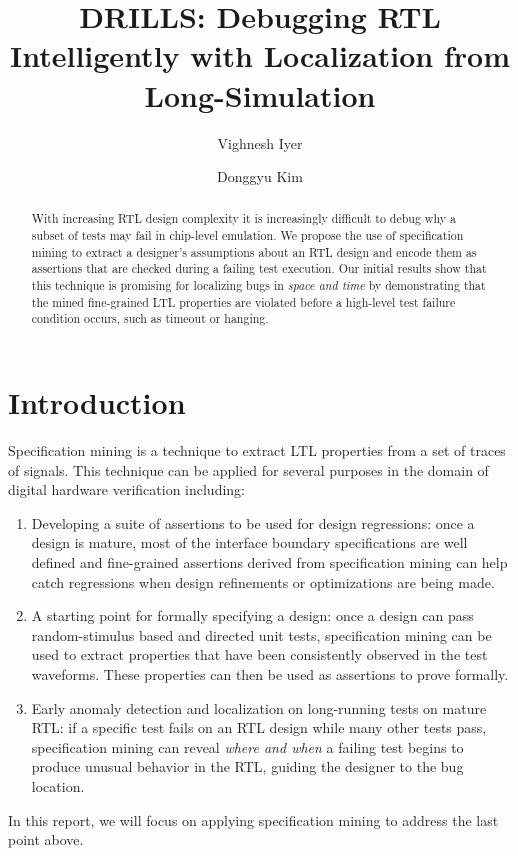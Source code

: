 \documentclass[acmlarge,11pt,nonacm]{acmart}
\begin{document}
\title{DRILLS: Debugging RTL Intelligently with Localization from Long-Simulation}
\author{Vighnesh Iyer}
\author{Donggyu Kim}
\renewcommand{\shortauthors}{Iyer and Kim}

\begin{abstract}
  With increasing RTL design complexity it is increasingly difficult to debug why a subset of tests may fail in chip-level emulation.
  We propose the use of specification mining to extract a designer's assumptions about an RTL design and encode them as assertions that are checked during a failing test execution.
  Our initial results show that this technique is promising for localizing bugs in \textit{space and time} by demonstrating that the mined fine-grained LTL properties are violated before a high-level test failure condition occurs, such as timeout or hanging.
\end{abstract}
\maketitle
\thispagestyle{empty}
\section{Introduction}
Specification mining is a technique to extract LTL properties from a set of traces of signals.
This technique can be applied for several purposes in the domain of digital hardware verification including:
\begin{enumerate}
  \item Developing a suite of assertions to be used for design regressions: once a design is mature, most of the interface boundary specifications are well defined and fine-grained assertions derived from specification mining can help catch regressions when design refinements or optimizations are being made.
  \item A starting point for formally specifying a design: once a design can pass random-stimulus based and directed unit tests, specification mining can be used to extract properties that have been consistently observed in the test waveforms. These properties can then be used as assertions to prove formally.
  \item Early anomaly detection and localization on long-running tests on mature RTL: if a specific test fails on an RTL design while many other tests pass, specification mining can reveal \textit{where and when} a failing test begins to produce unusual behavior in the RTL, guiding the designer to the bug location.
\end{enumerate}
In this report, we will focus on applying specification mining to address the last point above.
\end{document}
